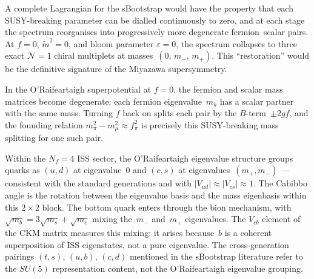 \documentclass[12pt,a4paper]{article}
\newcommand{\fpi}{f_\pi}
\begin{document}
A complete Lagrangian for the sBootstrap would have the property
that each SUSY-breaking parameter can be dialled continuously to
zero, and at each stage the spectrum reorganises into
progressively more degenerate fermion--scalar pairs.  At $f = 0$,
$\tilde{m}^2 = 0$, and bloom parameter $\varepsilon = 0$, the
spectrum collapses to three exact $\mathcal{N}=1$ chiral
multiplets at masses~$(0,\, m_-,\, m_+)$.  This ``restoration''
would be the definitive signature of the Miyazawa supersymmetry.

In the O'Raifeartaigh superpotential at $f = 0$, the fermion
and scalar mass matrices become degenerate: each fermion
eigenvalue~$m_k$ has a scalar partner with the same mass.
Turning $f$ back on splits each pair by the $B$-term~$\pm 2gf$,
and the founding relation $m_\pi^2 - m_\mu^2 \approx \fpi^2$
is precisely this SUSY-breaking mass splitting for one such pair.

Within the $N_f = 4$ ISS sector, the O'Raifeartaigh eigenvalue
structure groups quarks as $(u,d)$ at eigenvalue~$0$ and $(c,s)$
at eigenvalues~$(m_+, m_-)$ --- consistent with the standard
generations and with $|V_{ud}| \approx |V_{cs}| \approx 1$.
The Cabibbo angle is the rotation between the eigenvalue basis
and the mass eigenbasis within this $2\times 2$ block.
The bottom quark enters through the bion mechanism, with
$\sqrt{m_b} = 3\sqrt{m_s} + \sqrt{m_c}$ mixing the~$m_-$
and~$m_+$ eigenvalues.  The $V_{cb}$ element of the CKM matrix
measures this mixing: it arises because~$b$ is a coherent
superposition of ISS eigenstates, not a pure eigenvalue.
The cross-generation pairings $(t,s)$, $(u,b)$, $(c,d)$
mentioned in the sBootstrap literature refer to the
$SU(5)$ representation content, not the O'Raifeartaigh
eigenvalue grouping.
\end{document}
